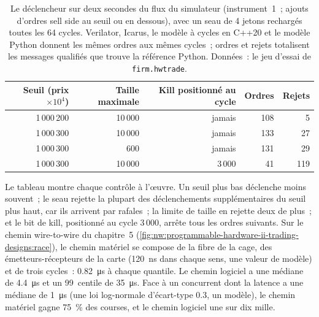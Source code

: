 \begin{table}[ht]
\centering\small
\begin{tabular}{rrrrr}
\toprule
Seuil (prix $\times 10^4$) & Taille maximale & Kill positionné au cycle & Ordres & Rejets \\
\midrule
1\,000\,200 & 10\,000 & jamais & 108 & 5 \\
1\,000\,300 & 10\,000 & jamais & 133 & 27 \\
1\,000\,300 & 600 & jamais & 131 & 29 \\
1\,000\,300 & 10\,000 & 3\,000 & 41 & 119 \\
\bottomrule
\end{tabular}
\caption{Le déclencheur sur deux secondes du flux du simulateur (instrument~1~; ajouts d'ordres sell side au seuil ou en dessous), avec un seau
de 4 jetons rechargés toutes les 64 cycles. Verilator, Icarus, le modèle à cycles en C++20 et le modèle Python donnent les mêmes ordres aux mêmes
cycles~; ordres et rejets totalisent les messages qualifiés que trouve la référence Python. Données~:
le jeu d'essai de \texttt{firm.hwtrade}.}\label{tab:nw:programmable-hardware-ii-trading-designs:runs}
\end{table}

Le tableau montre chaque contrôle à l'œuvre. Un seuil plus bas déclenche moins souvent~; le seau rejette la plupart des déclenchements supplémentaires du
seuil plus haut, car ils arrivent par rafales~; la limite de taille en rejette deux de plus~; et le bit de kill, positionné au cycle 3\,000, arrête tous les ordres suivants. Sur
le chemin wire-to-wire du chapitre~5 (\cref{fig:nw:programmable-hardware-ii-trading-designs:race}), le chemin matériel se compose de la fibre de la cage,
des émetteurs-récepteurs de la carte (\qty{120}{\nano\second} dans chaque sens, une valeur de modèle) et de trois cycles~: \qty{0.82}{\micro\second} à chaque quantile.
Le chemin logiciel a une médiane de \qty{4.4}{\micro\second} et un 99~centile de \qty{35}{\micro\second}. Face à un concurrent dont la latence a une
médiane de \qty{1}{\micro\second} (une loi log-normale d'écart-type 0.3, un modèle), le chemin matériel gagne 75~\% des courses, et le chemin logiciel
une sur dix mille.


